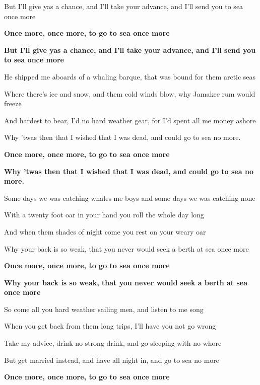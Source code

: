 \documentclass[letterpaper,9pt]{article}
\begin{document}
But I'll give yas a chance, and I'll take your advance, and I'll send you to sea once more

\hfill

\textbf{Once more, once more, to go to sea once more
}

\textbf{But I'll give yas a chance, and I'll take your advance, and I'll send you to sea once more}

\hfill

He shipped me aboards of a whaling barque, that was bound for them arctic seas

Where there's ice and snow, and them cold winds blow, why Jamakee rum would freeze

And hardest to bear, I'd no hard weather gear, for I'd spent all me money ashore

Why 'twas then that I wished that I was dead, and could go to sea no more.

\hfill

\textbf{Once more, once more, to go to sea once more
}

\textbf{Why 'twas then that I wished that I was dead, and could go to sea no more.}

\hfill

Some days we was catching whales me boys and some days we was catching none

With a twenty foot oar in your hand you roll the whole day long

And when them shades of night come you rest on your weary oar

Why your back is so weak, that you never would seek a berth at sea once more

\hfill

\textbf{Once more, once more, to go to sea once more
}

\textbf{Why your back is so weak, that you never would seek a berth at sea once more}

\hfill

So come all you hard weather sailing men, and listen to me song

When you get back from them long trips, I'll have you not go wrong

Take my advice, drink no strong drink, and go sleeping with no whore

But get married instead, and have all night in, and go to sea no more

\hfill

\textbf{Once more, once more, to go to sea once more
}
\end{document}
